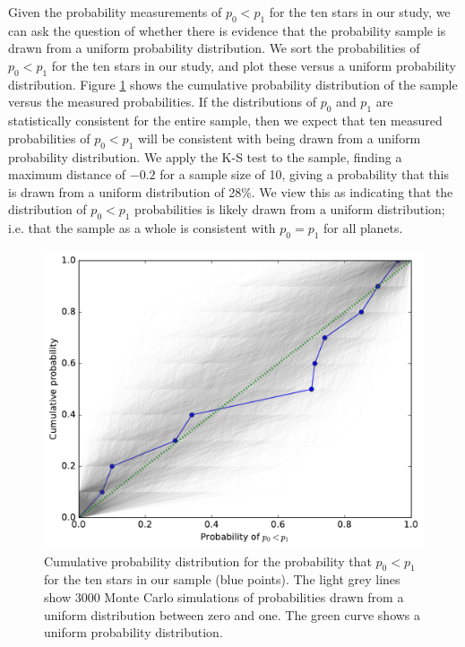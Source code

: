 Given the probability measurements of $p_0 < p_1$ for the ten stars in our study, we can ask the question of
whether there is evidence that the probability sample is drawn from a uniform probability distribution.  
We sort the probabilities of $p_0 < p_1$ for the ten stars in our study, and plot these versus a uniform
probability distribution.  Figure \ref{fig:ks_sample} shows the cumulative probability distribution 
of the sample versus the measured probabilities.  If the distributions of $p_0$ and $p_1$ are
statistically consistent for the entire sample, then we expect that ten measured probabilities
of $p_0 < p_1$ will be consistent with being drawn from a uniform probability distribution.  
We apply the
K-S test to the sample, finding a maximum distance of $-0.2$ for a sample size of 10,
giving a probability that this is drawn from a uniform distribution of 28\%.  We view this
as indicating that the distribution of $p_0<p_1$ probabilities is likely drawn from a uniform 
distribution;  i.e. that the sample as a whole is consistent with $p_0 = p_1$ for all planets.

\begin{figure}
    \centering
    \includegraphics[scale=0.45]{KS_p0_p1.pdf}
    \caption{Cumulative probability distribution for the probability that
    $p_0 < p_1$ for the ten stars in our sample (blue points).  The light grey lines show $3000$ Monte
    Carlo simulations of probabilities drawn from a uniform distribution between zero
    and one.  The green curve shows a uniform probability distribution.}
    \label{fig:ks_sample}
\end{figure}

